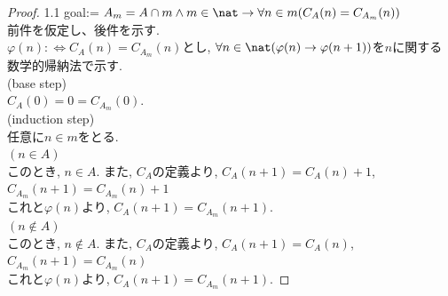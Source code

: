 \begin{proof}  1.1
 goal:= $A_m = A \cap m \land m \in \nat \rightarrow \forall n \in m (C_A(n) = C_{A_m}(n))$\\
 前件を仮定し、後件を示す.\\
 $\varphi (n) :\Leftrightarrow C_A(n) = C_{A_m}(n)$とし,
 $\forall n \in \nat (\varphi (n) \rightarrow \varphi (n+1))$を$n$に関する数学的帰納法で示す.\\
 (base step)\\
 $C_A(0) = 0 = C_{A_m}(0)$.\\
 (induction step) \\
 任意に$n \in m$をとる.\\
 $(n \in A)$\\
 このとき,
 $n \in A$.
 また,
 $C_A$の定義より,
 $C_A(n+1) = C_A(n) + 1$,
 $C_{A_m}(n+1) = C_{A_m}(n) + 1$\\
 これと$\varphi (n)$より,
 $C_A(n+1) = C_{A_m}(n+1)$.\\
 $(n \not\in A)$\\
 このとき,
 $n \not\in A$.
 また,
 $C_A$の定義より,
 $C_A(n+1) = C_A(n)$,
 $C_{A_m}(n+1) = C_{A_m}(n)$\\
 これと$\varphi (n)$より,
 $C_A(n+1) = C_{A_m}(n+1)$.
\end{proof}

